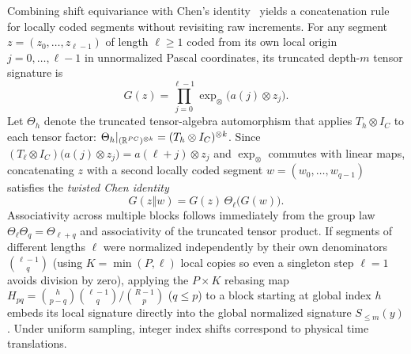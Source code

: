 Combining shift equivariance with Chen's identity~\cite{chen} yields a
concatenation rule for locally coded segments without revisiting raw increments.
For any segment \(z = (z_0, \ldots, z_{\ell-1})\) of
length \(\ell \geq 1\) coded from its own local origin \(j = 0, \ldots, \ell-1\)
in unnormalized Pascal coordinates, its truncated depth-\(m\) tensor signature is
\begin{equation}\label{eq:reset-signature}
 G(z) = \prod_{j=0}^{\ell-1} \exp_\otimes\bigl(a(j) \otimes z_j\bigr).
\end{equation}
Let \(\Theta_h\) denote the truncated tensor-algebra automorphism that applies
\(T_h \otimes I_C\) to each tensor factor:
\(\Theta_h|_{(\mathbb{R}^{PC})^{\otimes k}} = (T_h \otimes I_C)^{\otimes k}\). Since
\((T_\ell \otimes I_C)\bigl(a(j) \otimes z_j\bigr) = a(\ell + j) \otimes z_j\)
and \(\exp_\otimes\) commutes with linear maps, concatenating \(z\) with a second
locally coded segment \(w = (w_0, \ldots, w_{q-1})\) satisfies the
\emph{twisted Chen identity}
\begin{equation}\label{eq:reset-chen}
 G(z \mathbin\Vert w) = G(z)\,\Theta_\ell\bigl(G(w)\bigr).
\end{equation}
Associativity across multiple blocks follows immediately from the group law
\(\Theta_\ell \Theta_q = \Theta_{\ell+q}\) and associativity of the truncated
tensor product. If segments of different lengths \(\ell\) were normalized
independently by their own denominators \(\binom{\ell-1}{q}\) (using
\(K = \min(P, \ell)\) local copies so even a singleton step \(\ell = 1\) avoids
division by zero), applying the \(P \times K\) rebasing map
\(H_{pq} = \binom{h}{p-q}\binom{\ell-1}{q}/\binom{R-1}{p}\) (\(q \leq p\)) to a
block starting at global index \(h\) embeds its local signature directly into the
global normalized signature \(S_{\leq m}(y)\). Under uniform sampling, integer
index shifts correspond to physical time translations.

